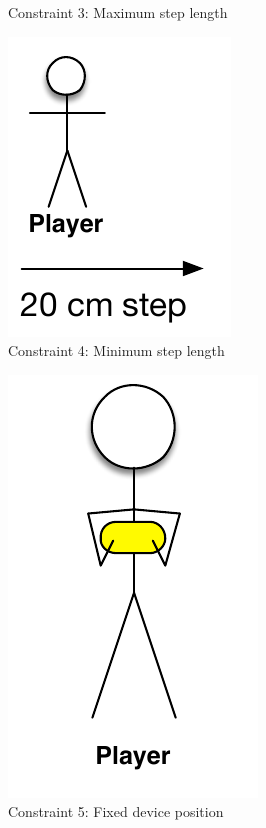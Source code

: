 \begin{figure}[H]
\begin{subfigure}[b]{0.45\textwidth}
		\caption{Constraint 3: Maximum step length}
		\label{figure:maximum-step}
	\end{subfigure}
	\begin{subfigure}[b]{0.45\textwidth}
		\centering
		\includegraphics[scale = 0.45]{media/constraints/04-minimum-step}
		\caption{Constraint 4: Minimum step length}
		\label{figure:minimum-step}
	\end{subfigure}
	\qquad
	\begin{subfigure}[b]{0.45\textwidth}
		\centering
		\includegraphics[scale = 0.45]{media/constraints/05-fixed-device-position}
		\caption{Constraint 5: Fixed device position}
		\label{figure:fixed-device-position}
	\end{subfigure}
	\begin{subfigure}[b]{0.45\textwidth}

\end{subfigure}
\end{figure}
